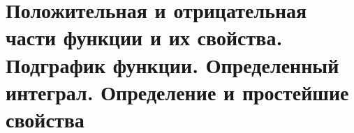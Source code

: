 \section{Положительная и отрицательная части функции и их свойства. Подграфик функции. Определенный интеграл. Определение и простейшие свойства}
